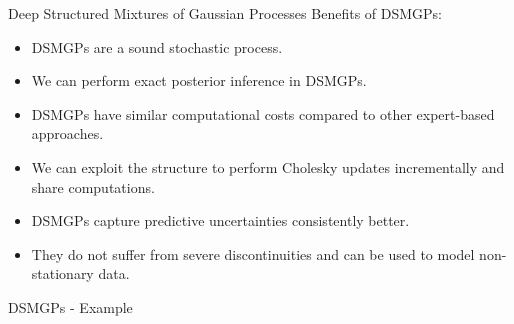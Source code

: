 \begin{frame}{Deep Structured Mixtures of Gaussian Processes}
Benefits of DSMGPs:
\begin{itemize}
    \item DSMGPs are a sound stochastic process.
    \item We can perform exact posterior inference in DSMGPs.
    \item DSMGPs have similar computational costs compared to other expert-based approaches.
    \item We can exploit the structure to perform Cholesky updates incrementally and share computations.
    \item DSMGPs capture predictive uncertainties consistently better.
    \item They do not suffer from severe discontinuities and can be used to model non-stationary data.
\end{itemize}

\end{frame}

\begin{frame}{DSMGPs - Example}
\end{frame}
